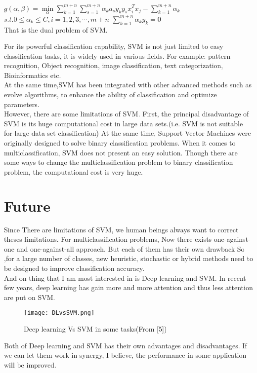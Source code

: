 \documentclass{article}
\begin{document}
\noindent $g(\alpha,\beta) = \min\limits_{\alpha} \sum\limits_{k=1}^{m+n} \sum\limits_{s=1}^{m+n}\alpha_k a_s y_k y_s x_i^T x_j - \sum\limits_{k=1}^{m+n} \alpha_k$\\
$s.t. 0 \leq \alpha_k \leq C, i = 1,2,3, \cdots,m+n$
$\sum\limits_{k=1}^{m+n}\alpha_k y_k = 0$\\
That is the dual problem of SVM.

For its powerful classification capability, SVM is not just limited to easy classification tasks, it is widely used in various fields. 
For example: pattern recognition, Object recognition, image classification, text categorization, Bioinformatics etc.\\
At the same time,SVM has been integrated with other advanced methods such as evolve algorithms, to enhance
the ability of classification and optimize parameters. \\
\indent However, there are some limitations of SVM. First, the principal disadvantage of SVM is its huge
computational cost in large data sets.(i.e. SVM is not suitable for large data set classification)
At the same time, Support Vector Machines were originally designed to solve binary classification problems. When it comes to multiclassification, SVM does not present an easy solution. 
Though there are some ways to change the multiclassification problem to binary classification problem, the computational cost is very huge.



\section{Future}
Since There are limitations of SVM, we human beings always want to correct theses limitations.
For multiclassification problems, Now there exists one-against-one and one-against-all approach. But each of them has their own drawback
So ,for a large number of classes, new heuristic, stochastic or hybrid methods need to be designed to improve classification accuracy.\\
And on thing that I am most interested in is Deep learning and SVM. In recent few years, deep learning has gain more and more attention and thus less attention are put on SVM.
\begin{figure}[H] 
    \centering 
    \texttt{[image: DLvsSVM.png]}
    \caption*{Deep learning Vs SVM in some tasks(From [5])}
\end{figure}

Both of Deep learning and SVM has their own advantages and disadvantages. If we can let them work in synergy, I believe, the performance in some application will be improved.
\end{document}
